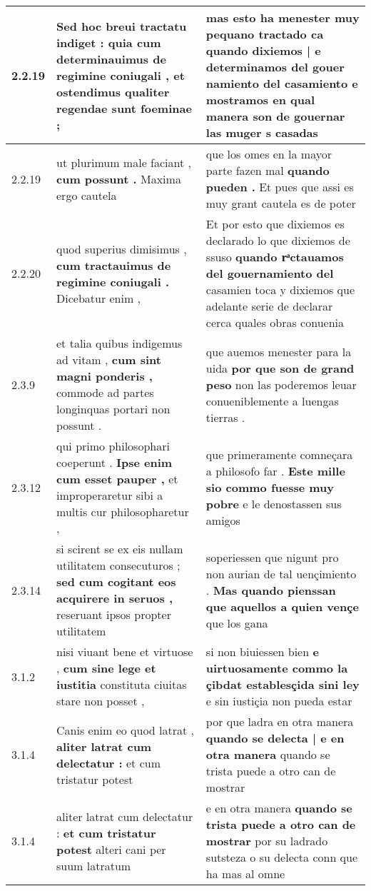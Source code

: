 \begin{tabular}{|p{1cm}|p{6.5cm}|p{6.5cm}|}
2.2.19 & Sed hoc breui tractatu indiget : \textbf{ quia cum determinauimus de regimine coniugali , } et ostendimus qualiter regendae sunt foeminae ; & mas esto ha menester muy pequano tractado \textbf{ ca quando dixiemos | e determinamos del gouer namiento del casamiento } e mostramos en qual manera son de gouernar las muger s casadas \\\hline
2.2.19 & ut plurimum male faciant , \textbf{ cum possunt . } Maxima ergo cautela & que los omes en la mayor parte fazen mal \textbf{ quando pueden . } Et pues que assi es muy grant cautela es de poter \\\hline
2.2.20 & quod superius dimisimus , \textbf{ cum tractauimus de regimine coniugali . } Dicebatur enim , & Et por esto que dixiemos es declarado lo que dixiemos de ssuso \textbf{ quando rͣctauamos del gouernamiento del } casamien toca y dixiemos que adelante serie de declarar cerca quales obras conuenia \\\hline
2.3.9 & et talia quibus indigemus ad vitam , \textbf{ cum sint magni ponderis , } commode ad partes longinquas portari non possunt . & que auemos menester para la uida \textbf{ por que son de grand peso } non las poderemos leuar conueniblemente a luengas tierras . \\\hline
2.3.12 & qui primo philosophari coeperunt . \textbf{ Ipse enim cum esset pauper , } et improperaretur sibi a multis cur philosopharetur , & que primeramente comneçara a philosofo far . \textbf{ Este mille sio commo fuesse muy pobre } e le denostassen sus amigos \\\hline
2.3.14 & si scirent se ex eis nullam utilitatem consecuturos ; \textbf{ sed cum cogitant eos acquirere in seruos , } reseruant ipsos propter utilitatem & soperiessen que nigunt pro non aurian de tal uençimiento . \textbf{ Mas quando pienssan que aquellos a quien vençe } que los gana \\\hline
3.1.2 & nisi viuant bene et virtuose , \textbf{ cum sine lege et iustitia } constituta ciuitas stare non posset , & si non biuiessen bien \textbf{ e uirtuosamente commo la çibdat establesçida sini ley } e sin iustiçia non pueda estar \\\hline
3.1.4 & Canis enim eo quod latrat , \textbf{ aliter latrat cum delectatur : } et cum tristatur potest & por que ladra en otra manera \textbf{ quando se delecta | e en otra manera } quando se trista puede a otro can de mostrar \\\hline
3.1.4 & aliter latrat cum delectatur : \textbf{ et cum tristatur potest } alteri cani per suum latratum & e en otra manera \textbf{ quando se trista puede a otro can de mostrar } por su ladrado sutsteza o su delecta conn que ha mas al omne \\\hline

\end{tabular}
